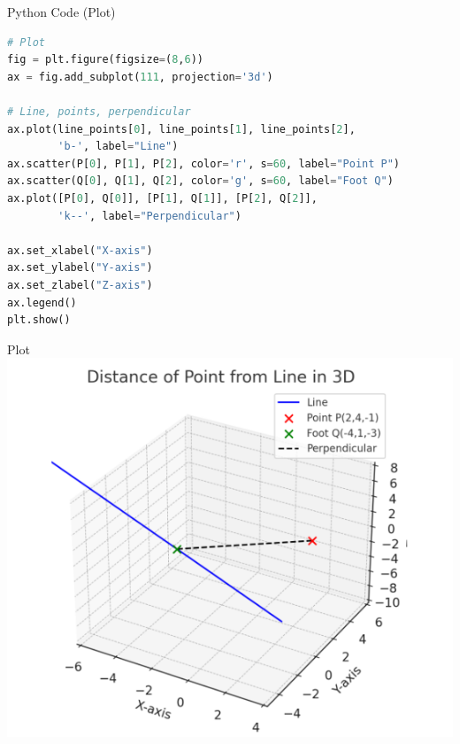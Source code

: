 \documentclass{beamer}
\begin{document}
\begin{frame}[fragile]{Python Code (Plot)}
\begin{lstlisting}[language=Python]
# Plot
fig = plt.figure(figsize=(8,6))
ax = fig.add_subplot(111, projection='3d')

# Line, points, perpendicular
ax.plot(line_points[0], line_points[1], line_points[2],
        'b-', label="Line")
ax.scatter(P[0], P[1], P[2], color='r', s=60, label="Point P")
ax.scatter(Q[0], Q[1], Q[2], color='g', s=60, label="Foot Q")
ax.plot([P[0], Q[0]], [P[1], Q[1]], [P[2], Q[2]],
        'k--', label="Perpendicular")

ax.set_xlabel("X-axis")
ax.set_ylabel("Y-axis")
ax.set_zlabel("Z-axis")
ax.legend()
plt.show()
\end{lstlisting}
\end{frame}


\begin{frame}{Plot}
\centering
\includegraphics[width=0.8\columnwidth]{figs/plot7.png}
\end{frame}
\end{document}
